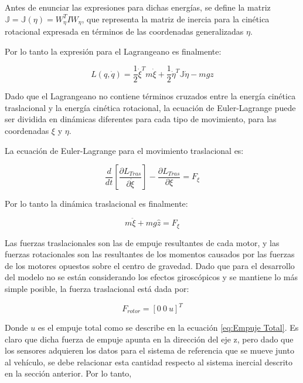 \documentclass[\main/main.tex]{subfiles}
\begin{document}
Antes de enunciar las expresiones para dichas energías, se define
la matriz $\mathbb{J}=\mathbb{J}(\eta)=W_{\eta}^{T}IW_{\eta}$, que
representa la matriz de inercia para la cinética rotacional expresada
en términos de las coordenadas generalizadas $\eta$.

Por lo tanto la expresión para el Lagrangeano es finalmente:

\begin{equation}
L(q,\dot{q})=\frac{1}{2}\dot{\xi}^{T}m\dot{\xi}+\frac{1}{2}\dot{\eta}^{T}\mathbb{J}\dot{\eta}-mgz
\end{equation}

Dado que el Lagrangeano no contiene términos cruzados entre la energía
cinética traslacional y la energía cinética rotacional, la ecuación
de Euler-Lagrange puede ser dividida en dinámicas diferentes para
cada tipo de movimiento, para las coordenadas $\xi$ y $\eta$.

La ecuación de Euler-Lagrange para el movimiento traslacional es:

\begin{equation}
\frac{d}{dt}\left[\frac{\partial L_{Tras}}{\partial\dot{\xi}}\right]-\frac{\partial L_{Tras}}{\partial\xi}=F_{\xi}
\end{equation}


Por lo tanto la dinámica traslacional es finalmente:

\begin{equation}
m\ddot{\xi}+mg\hat{z}=F_{\xi}
\end{equation}

Las fuerzas traslacionales son las de empuje resultantes de cada motor,
y las fuerzas rotacionales son las resultantes de los momentos causados
por las fuerzas de los motores opuestos sobre el centro de gravedad.
Dado que para el desarrollo del modelo no se están considerando los
efectos giroscópicos y se mantiene lo más simple posible, la fuerza
traslacional está dada por:

\begin{equation}
F_{rotor}=[0\ 0\ u]^{T}
\end{equation}

Donde $u$ es el empuje total como se describe en la ecuación \ref{eq:Empuje Total}.
Es claro que dicha fuerza de empuje apunta en la dirección del eje
z, pero dado que los sensores adquieren los datos para el sistema
de referencia que se mueve junto al vehículo, se debe relacionar esta
cantidad respecto al sistema inercial descrito en la sección anterior.
Por lo tanto, 
\end{document}
